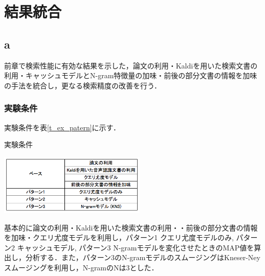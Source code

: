\chapter{結果統合}

\section{a}


前章で検索性能に有効な結果を示した，論文の利用・Kaldiを用いた検索文書の利用・キャッシュモデルとN-gram特徴量の加味・前後の部分文書の情報を加味の手法を統合し，更なる検索精度の改善を行う．

\subsection{実験条件}
実験条件を表\ref{t_ex_patern}に示す．

\begin{table}[h]
    \centering
    \caption{実験条件}
    \includegraphics[width=7cm]{./image/t_ex_patern.png}
    \label{t_ex_patern}
\end{table}

基本的に論文の利用・Kaldiを用いた検索文書の利用・・前後の部分文書の情報を加味・クエリ尤度モデルを利用し，パターン1 クエリ尤度モデルのみ, パターン2 キャッシュモデル, パターン3 N-gramモデルを変化させたときのMAP値を算出し，分析する．また，パターン3のN-gramモデルのスムージングはKneser-Ney スムージングを利用し，N-gramのNは3とした．
